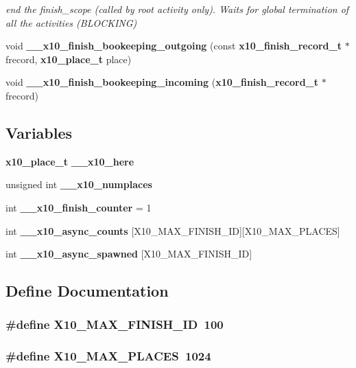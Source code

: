 \begin{CompactItemize}
\begin{CompactList}\small\item\em end the finish\_\-scope (called by root activity only). Waits for global termination of all the activities (BLOCKING) \item\end{CompactList}\item 
void {\bf \_\-\_\-x10\_\-finish\_\-bookeeping\_\-outgoing} (const {\bf x10\_\-finish\_\-record\_\-t} $\ast$frecord, {\bf x10\_\-place\_\-t} place)
\item 
void {\bf \_\-\_\-x10\_\-finish\_\-bookeeping\_\-incoming} ({\bf x10\_\-finish\_\-record\_\-t} $\ast$frecord)
\end{CompactItemize}
\subsection*{Variables}
\begin{CompactItemize}
\item 
{\bf x10\_\-place\_\-t} {\bf \_\-\_\-x10\_\-here}
\item 
unsigned int {\bf \_\-\_\-x10\_\-numplaces}
\item 
int {\bf \_\-\_\-x10\_\-finish\_\-counter} = 1
\item 
int {\bf \_\-\_\-x10\_\-async\_\-counts} [X10\_\-MAX\_\-FINISH\_\-ID][X10\_\-MAX\_\-PLACES]
\item 
int {\bf \_\-\_\-x10\_\-async\_\-spawned} [X10\_\-MAX\_\-FINISH\_\-ID]
\end{CompactItemize}


\subsection{Define Documentation}
\subsubsection{\setlength{\rightskip}{0pt plus 5cm}\#define X10\_\-MAX\_\-FINISH\_\-ID\ 100}\label{finish_8cc_a0}


\subsubsection{\setlength{\rightskip}{0pt plus 5cm}\#define X10\_\-MAX\_\-PLACES\ 1024}\label{finish_8cc_a1}




